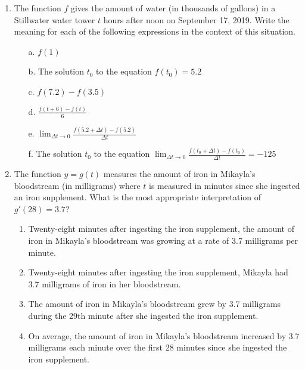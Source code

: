 \documentclass[12pt]{report}
\begin{document}
\begin{enumerate}
\pagebreak

\item The function $f$ gives the amount of water (in thousands of gallons) in a Stillwater water tower $t$ hours after noon on September 17, 2019. Write the meaning for each of the following expressions in the context of this situation.
\vspace{0.2cm}
\begin{enumerate}
\item [a.]  $f(1)$ \vspace{0.1cm} 
\item [b.]  The solution $t_0$ to the equation $f(t_0)=5.2$ \vspace{0.1cm}  
\item [c.]  $f(7.2)-f(3.5)$ \vspace{0.1cm}
\item [d.]  $\frac{f(t+6)-f(t)}{6}$ \vspace{0.1cm}
\item [e.]  $\lim_{\Delta t\rightarrow 0}\frac{f(5.2+\Delta t)-f(5.2)}{\Delta t}$
\item [f.] The solution $t_0$ to the equation $\lim_{\Delta t\rightarrow 0}\frac{f(t_0+\Delta t)-f(t_0)}{\Delta t}=-125$
\end{enumerate}

\item The function $y=g(t)$ measures the amount of iron in Mikayla's bloodstream (in milligrams) where $t$ is measured in minutes since she ingested an iron supplement. What is the most appropriate interpretation of $g'(28)=3.7$?

\begin{enumerate}

\item Twenty-eight minutes after ingesting the iron supplement, the amount of iron in Mikayla's bloodstream was growing at a rate of 3.7 milligrams per minute.

\item Twenty-eight minutes after ingesting the iron supplement, Mikayla had 3.7 milligrams of iron in her bloodstream.

\item The amount of iron in Mikayla's bloodstream grew by 3.7 milligrams during the 29th minute after she ingested the iron supplement.

\item On average, the amount of iron in Mikayla's bloodstream increased by 3.7 milligrams each minute over the first 28 minutes since she ingested the iron supplement.


\end{enumerate}
\end{enumerate}
\end{document}
